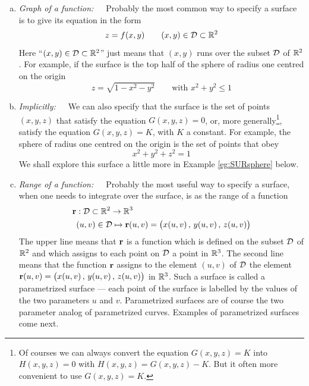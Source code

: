\begin{enumerate}[(a)]
\item \emph{Graph of a function:}\ \ \  Probably the most common way 
to specify a surface is to give its equation in the form
\begin{equation*}
 z = f(x,y)\qquad (x,y)\in\mathcal{D}\subset\mathbb{R}^2
\end{equation*} 
Here ``{$(x,y)\in\mathcal{D}\subset\mathbb{R}^2$}'' just means that $(x,y)$ runs over the
subset $\mathcal{D}$ of $\mathbb{R}^2$.
For example, if the surface is the top half of the sphere of radius 
one centred on the origin
\begin{equation*}
 z = \sqrt{1-x^2-y^2}\qquad \text{with } x^2+y^2 \le 1
\end{equation*} 

\item \emph{Implicitly:}\ \ \ We can also specify that the surface 
is the set of points $(x,y,z)$ that satisfy the equation
$G(x,y,z)=0$, or, more generally\footnote{Of courses we can always
convert the equation $G(x,y,z)=K$ into $H(x,y,z)=0$ 
with $H(x,y,z)=G(x,y,z)-K$. But it often more convenient to use $G(x,y,z)=K$.}, satisfy the equation $G(x,y,z)=K$,
with $K$ a constant. For example, the sphere of radius 
one centred on the origin is the set of points that obey
\begin{equation*}
x^2+y^2+z^2=1
\end{equation*}
We shall explore this surface a little more in Example
\ref{eg:SURsphere} below.

\item \emph{Range of a function:}\ \ \  Probably the most useful
way to specify a surface, when one needs to integrate over the surface,
is as the range of a function
\begin{align*}
\mathbf{r}&: \mathcal{D}\subset\mathbb{R}^2 \rightarrow \mathbb{R}^3 \\
   &(u,v) \in\mathcal{D} \mapsto \mathbf{r}(u,v) =\big(x(u,v)\,,\,y(u,v)\,,\,z(u,v)\big)
\end{align*}
The upper line means that $\mathbf{r}$ is a function which is defined on the subset
$\mathcal{D}$ of $\mathbb{R}^2$ and which assigns to each point on $\mathcal{D}$ a point 
in $\mathbb{R}^3$.
The second line means that the function $\mathbf{r}$ assigns to the element
$(u,v)$ of $\mathcal{D}$ the element  $\mathbf{r}(u,v) =\big(x(u,v)\,,\,y(u,v)\,,\,z(u,v)\big)$
in $\mathbb{R}^3$. Such a surface is called a parametrized surface --- each point 
of the surface is labelled by the values of the two parameters $u$ and $v$.
Parametrized surfaces are of course the two parameter analog of parametrized 
curves. Examples of parametrized surfaces come next. 
\end{enumerate}

